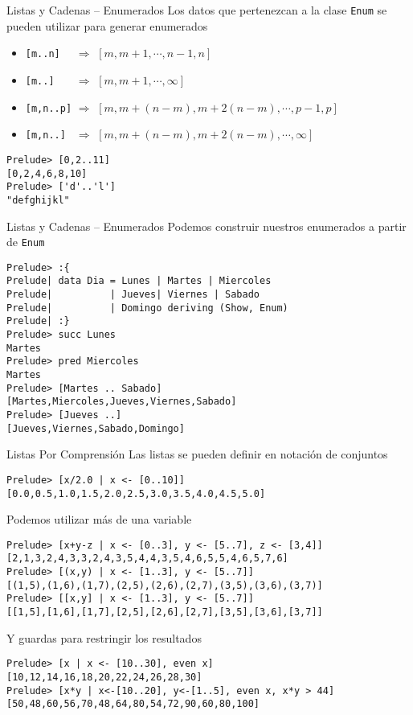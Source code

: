 \begin{frame}[fragile]{Listas y Cadenas -- Enumerados}
    Los datos que pertenezcan a la clase \verb|Enum| se pueden utilizar para generar enumerados
    \begin{itemize}
        \item \verb|[m..n]  | $\Rightarrow$ $[m, m+1, \cdots, n-1, n]$
        \item \verb|[m..]   | $\Rightarrow$ $[m, m+1, \cdots, \infty]$
        \item \verb|[m,n..p]| $\Rightarrow$ $[m, m+(n-m), m+2(n-m), \cdots, p-1, p]$
        \item \verb|[m,n..] | $\Rightarrow$ $[m, m+(n-m), m+2(n-m), \cdots, \infty]$
    \end{itemize}
    \begin{lstlisting}[style=consola]
Prelude> [0,2..11]
[0,2,4,6,8,10]
Prelude> ['d'..'l']
"defghijkl"
    \end{lstlisting}
\end{frame}

\begin{frame}[fragile]{Listas y Cadenas -- Enumerados}
    Podemos construir nuestros enumerados a partir de \verb|Enum|
    \begin{lstlisting}[style=consola]
Prelude> :{
Prelude| data Dia = Lunes | Martes | Miercoles
Prelude|          | Jueves| Viernes | Sabado 
Prelude|          | Domingo deriving (Show, Enum)
Prelude| :}
Prelude> succ Lunes
Martes
Prelude> pred Miercoles 
Martes
Prelude> [Martes .. Sabado]
[Martes,Miercoles,Jueves,Viernes,Sabado]
Prelude> [Jueves ..]
[Jueves,Viernes,Sabado,Domingo]
    \end{lstlisting}
\end{frame}

\begin{frame}[fragile]{Listas Por Comprensión}
    Las listas se pueden definir en notación de conjuntos
    \begin{lstlisting}[style=consola]
Prelude> [x/2.0 | x <- [0..10]]
[0.0,0.5,1.0,1.5,2.0,2.5,3.0,3.5,4.0,4.5,5.0]
    \end{lstlisting}
    Podemos utilizar más de una variable
    \begin{lstlisting}[style=consola]
Prelude> [x+y-z | x <- [0..3], y <- [5..7], z <- [3,4]]
[2,1,3,2,4,3,3,2,4,3,5,4,4,3,5,4,6,5,5,4,6,5,7,6]
Prelude> [(x,y) | x <- [1..3], y <- [5..7]]
[(1,5),(1,6),(1,7),(2,5),(2,6),(2,7),(3,5),(3,6),(3,7)]
Prelude> [[x,y] | x <- [1..3], y <- [5..7]]
[[1,5],[1,6],[1,7],[2,5],[2,6],[2,7],[3,5],[3,6],[3,7]]
    \end{lstlisting}
    Y guardas para restringir los resultados
    \begin{lstlisting}[style=consola]
Prelude> [x | x <- [10..30], even x] 
[10,12,14,16,18,20,22,24,26,28,30]
Prelude> [x*y | x<-[10..20], y<-[1..5], even x, x*y > 44]
[50,48,60,56,70,48,64,80,54,72,90,60,80,100]
    \end{lstlisting}
\end{frame}


